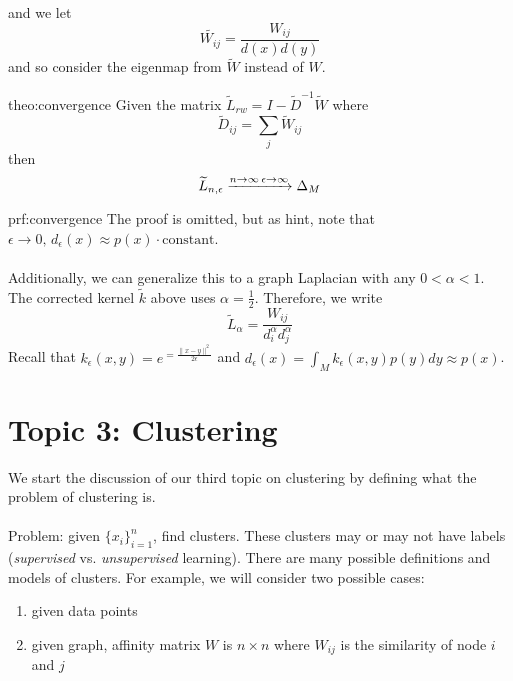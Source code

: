 \documentclass[12pt]{article}
\begin{document}
and we let
\[
\widetilde{W_{ij}} = \frac{W_{ij}}{d(x) d(y)}
\]
and so consider the eigenmap from $ \widetilde{W} $ instead of $ W $.
\begin{theo}{theo:convergence}
	Given the matrix $ \widetilde{L}_{rw} = I - \widetilde{D}^{-1} \widetilde{W} $ where
	\[
	\widetilde{D}_{ij} = \sum_j \widetilde{W}_{ij}
	\]
	then
	\[
	\widetilde{L}_{n, \epsilon} \xrightarrow{n \to \infty \\ \epsilon \to \infty} \Delta_M
	\]
\end{theo}
\begin{prf}{prf:convergence}
	The proof is omitted, but as hint, note that $ \epsilon \to 0, \, d_{\epsilon} (x) \approx p(x) \cdot \text{constant} $.
	\\ \\
	Additionally, we can generalize this to a graph Laplacian with any $ 0 < \alpha < 1 $.
	The corrected kernel $\widetilde{k}$ above uses $\alpha = \frac{1}{2}$.
	Therefore, we write
	\[
	\widetilde{L}_{\alpha} = \frac{W_{ij}}{d_i^{\alpha} d_j^{\alpha}}
	\]
	Recall that $k_{\epsilon} (x, y) = e^{= \frac{\| x - y \|^2}{2 \epsilon}}$ and $d_{\epsilon} (x) = \int_M k_{\epsilon} (x, y) p(y) dy \approx p(x)$.
\end{prf}

\section{Topic 3: Clustering}
We start the discussion of our third topic on clustering by defining what the problem of clustering is.
\\ \\
Problem: given $ \{ x_i \}_{i = 1}^n $, find clusters.
These clusters may or may not have labels (\textit{supervised} vs. \textit{unsupervised} learning).
There are many possible definitions and models of clusters.
For example, we will consider two possible cases:
\begin{enumerate}
    \item given data points
    \item given graph, affinity matrix $W $ is $ n \times n $ where $ W_{ij} $ is the similarity of node $ i $ and $ j $
\end{enumerate}
\end{document}
